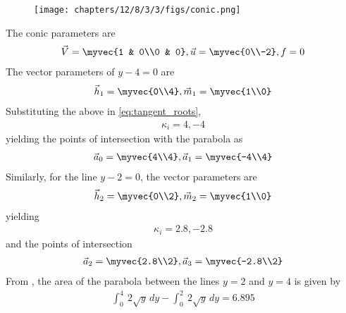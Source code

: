 	\begin{figure}[H]
		\centering
 \texttt{[image: chapters/12/8/3/3/figs/conic.png]}
		\caption{}
		\label{fig:12/8/3/3}
  	\end{figure}
The conic parameters are
\begin{align}
	\vec{V} = \myvec{1 & 0\\0 & 0},
	\vec{u} = \myvec{0\\-2},
	f = 0
\end{align}
The vector parameters of 
$y-4=0$
are
\begin{align}
	\vec{h}_1=\myvec{0\\4},
	\vec{m}_1=\myvec{1\\0}
\end{align}
Substituting the above in \eqref{eq:tangent_roots},
\begin{align}
\kappa_i=4,-4
\end{align}
yielding
the points of intersection with the parabola as
\begin{align}
\vec{a}_0=\myvec{4\\4},
\vec{a}_1=\myvec{-4\\4}
\end{align}
Similarly, for 
the line $y-2=0$, the vector parameters are
\begin{align}
\vec{h}_2=\myvec{0\\2},
\vec{m}_2=\myvec{1\\0}
\end{align}
yielding 
\begin{align}
\kappa_i=2.8,-2.8
\end{align}
and the points of intersection
\begin{align}
\vec{a}_2=\myvec{2.8\\2},
\vec{a}_3=\myvec{-2.8\\2}
\end{align}
From 
		,
the area of the parabola between the lines $y=2$ and $y=4$ is given by
\begin{align}
\int_{0}^{4} \ 2\sqrt{y} \,dy-\int_{0}^{2} \ 2\sqrt{y} \,dy
=6.895 
\end{align}
